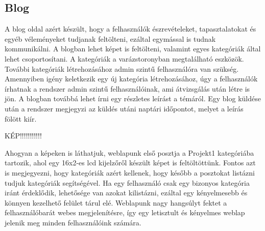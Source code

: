 \documentclass[
]{thesis-ekf}
\theoremstyle{definition}
\theoremstyle{remark}
\begin{document}
		\subsection{Blog}
			\par A blog oldal azért készült, hogy a felhasználók észrevételeket, tapasztalatokat és egyéb véleményeket tudjanak feltölteni, ezáltal egymással is tudnak kommunikálni. A blogban lehet képet is feltölteni, valamint egyes kategóriák által lehet csoportosítani. A kategóriák a varázstoronyban megtalálható eszközök. További kategóriák létrehozásához admin szintű felhasználóra van szükség. Amennyiben igény keletkezik egy új kategória létrehozásához, úgy a felhasználók írhatnak a rendszer admin szintű felhasználóinak, ami átvizsgálás után létre is jön. A blogban továbbá lehet írni egy részletes leírást a témáról. Egy blog küldése után a rendszer megjegyzi az küldés utáni naptári időpontot, melyet a leírás fölött kiír.
			\par KÉP!!!!!!!!!!!
			\par Ahogyan a képeken is láthatjuk, weblapunk első posztja a Projekt1 kategóriába tartozik, ahol egy 16x2-es lcd kijelzőről készült képet is feltöltöttünk. Fontos azt is megjegyezni, hogy kategóriák azért kellenek, hogy később a posztokat listázni tudjuk kategóriák segítségével. Ha egy felhasználó csak egy bizonyos kategória iránt érdeklődik, lehetősége van azokat kilistázni, ezáltal egy kényelmesebb és könnyen kezelhető felület tárul elé. Weblapunk nagy hangsúlyt fektet a felhasználóbarát webes megjelenítésre, így egy letisztult és kényelmes weblap jelenik meg minden felhasználóink számára.
\end{document}
